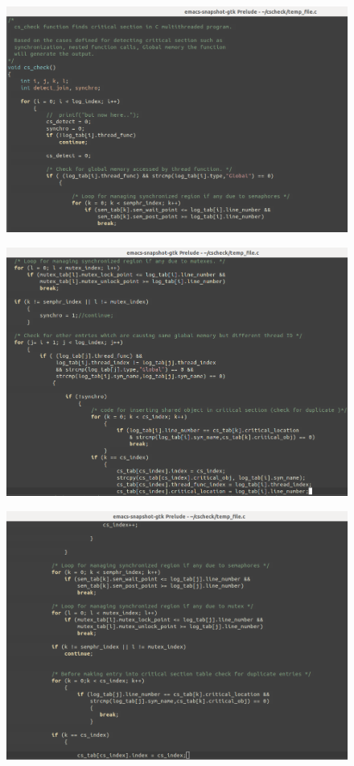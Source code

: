 \begin{figure}[H]
\centering
\includegraphics[scale=0.4]{Snaps/util_15.png}
\label{<<Label>>}
\end{figure}

\begin{figure}[H]
\centering
\includegraphics[scale=0.4]{Snaps/util_16.png}
\label{<<Label>>}
\end{figure}

\begin{figure}[H]
\centering
\includegraphics[scale=0.4]{Snaps/util_17.png}
\label{<<Label>>}
\end{figure}

